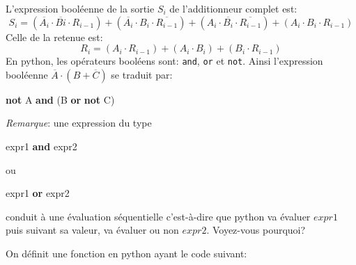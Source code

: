 \documentclass[11pt,french]{article}
\newenvironment{Shaded}{}{}
\newcommand{\KeywordTok}[1]{\textcolor[rgb]{0.00,0.44,0.13}{\textbf{{#1}}}}
\newcommand{\NormalTok}[1]{{#1}}
\begin{document}
    L'expression booléenne de la sortie \(S_i\) de l'additionneur complet
est:
\[S_i=(\overline{A_i} \cdot \overline{Bi} \cdot R_{i-1}) + (\overline{A_i} \cdot B_i \cdot \overline{R_{i-1}}) + (A_i \cdot \overline{B_i} \cdot \overline{R_{i-1}}) + (A_i \cdot B_i \cdot R_{i-1})\]
Celle de la retenue est:
\[R_i=(A_i \cdot R_{i-1}) + (A_i \cdot B_i) + (B_i \cdot R_{i-1})\]
En python, les opérateurs booléens sont: \texttt{and}, \texttt{or} et
\texttt{not}. Ainsi l'expression booléenne
\(\overline{A}\cdot(B+\overline{C})\) se traduit par:

\begin{Shaded}
\begin{Highlighting}[]
\KeywordTok{not}\NormalTok{ A }\KeywordTok{and}\NormalTok{ (B }\KeywordTok{or} \KeywordTok{not}\NormalTok{ C)}
\end{Highlighting}
\end{Shaded}
\emph{Remarque}: une expression du type 
\begin{Shaded}
\begin{Highlighting}[]
\NormalTok{ expr1 }\KeywordTok{and }\NormalTok{expr2}
\end{Highlighting}
\end{Shaded}
ou 
\begin{Shaded}
\begin{Highlighting}[]
\NormalTok{expr1 }\KeywordTok{or }\NormalTok{expr2}
\end{Highlighting}
\end{Shaded}
conduit à une évaluation séquentielle c'est-à-dire que python va évaluer $expr1$ puis suivant sa valeur, va évaluer ou non $expr2$. Voyez-vous pourquoi? \par
On définit une fonction en python ayant le code suivant:
\end{document}
